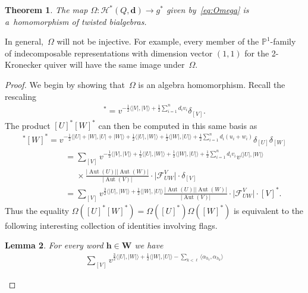 \documentclass[pdftex]{sigma}
\numberwithin{equation}{section}
\newtheorem{Theorem}{Theorem}[section]
\newtheorem{Lemma}[Theorem]{Lemma}
\begin{document}
\begin{Theorem}
\label{th:shuffle_character}
The map $\Omega: \mathcal{H}^*(Q,\mathbf{d})\to g^*$ given by~\eqref{eq:Omega} is a~homomorphism of twisted bialgebras.
\end{Theorem}

\begin{Remark}
In general,~$\Omega$ will not be injective.
For example, every member of the $\mathbb{P}^1$-family of indecomposable representations with dimension vector $(1,1)$
for the 2-Kronecker quiver will have the same image under~$\Omega$.
\end{Remark}

\begin{proof}
We begin by showing that~$\Omega$ is an algebra homomorphism.
Recall the rescaling
\begin{gather*}
[V]^*=v^{-\frac{1}{2}\langle |V|,|V|\rangle+\frac{1}{2}\sum\limits_{i=1}^n d_iv_i}\delta_{[V]}.
\end{gather*}
The product $[U]^*[W]^*$ can then be computed in this same basis as
\begin{gather*}
[U]^*[W]^*=v^{-\frac{1}{2}\langle |U|+|W|,|U|+|W|\rangle+\frac{1}{2}\langle |U|,|W|\rangle+\frac{1}{2}\langle
|W|,|U|\rangle+\frac{1}{2}\sum\limits_{i=1}^n d_i(u_i+w_i)}\delta_{[U]}\delta_{[W]}
\\
\phantom{[U]^*[W]^*}
 =\sum\limits_{[V]}v^{-\frac{1}{2}\langle |V|,|V|\rangle+\frac{1}{2}\langle |U|,|W|\rangle+\frac{1}{2}\langle
|W|,|U|\rangle+\frac{1}{2}\sum\limits_{i=1}^n d_iv_i}v^{\langle|U|,|W|\rangle}
\\
\phantom{[U]^*[W]^*=}{}
\times
\frac{|\operatorname{Aut}(U)||\operatorname{Aut}(W)|}{|\operatorname{Aut}(V)|}\cdot\big|\mathcal{F}^V_{UW}\big|\cdot \delta_{[V]}
\\
\phantom{[U]^*[W]^*}
 =\sum\limits_{[V]}v^{\frac{3}{2}\langle |U|,|W|\rangle+\frac{1}{2}\langle
|W|,|U|\rangle}\frac{|\operatorname{Aut}(U)||\operatorname{Aut}(W)|}{|\operatorname{Aut}(V)|}\cdot\big|\mathcal{F}^V_{UW}\big|\cdot [V]^*.
\end{gather*}
Thus the equality $\Omega([U]^*[W]^*)=\Omega([U]^*)\Omega([W]^*)$ is equivalent to the following interesting collection
of identities involving f\/lags.
\begin{Lemma}
\label{lem:flag_identity}
For every word $\mathbf{h}\in\mathbf{W}$ we have
\begin{gather}
\nonumber
\sum\limits_{[V]} v^{\frac{3}{2}\langle |U|,|W|\rangle+\frac{1}{2}\langle|W|,|U|\rangle-\sum\limits_{k<\ell}\langle\alpha_{h_\ell},\alpha_{h_k}\rangle}

\end{gather}
\end{Lemma}
\end{proof}
\end{document}
